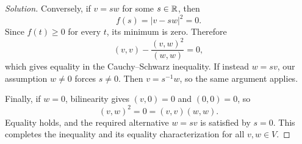 \begin{proof}[Solution]
  Conversely, if \(v=sw\) for some \(s\in\mathbb{R}\), then
  \[
    f(s)=|v-sw|^2=0.
  \]
  Since \(f(t)\ge0\) for every \(t\), its minimum is zero. Therefore
  \[
    (v,v)-\frac{(v,w)^2}{(w,w)}=0,
  \]
  which gives equality in the Cauchy--Schwarz inequality.
  If instead \(w=sv\), our assumption \(w\ne0\) forces
  \(s\ne0\). Then \(v=s^{-1}w\), so the same argument applies.

  Finally, if \(w=0\), bilinearity gives \((v,0)=0\) and
  \((0,0)=0\), so
  \[
    (v,w)^2=0=(v,v)(w,w).
  \]
  Equality holds, and the required alternative \(w=sv\) is satisfied
  by \(s=0\). This completes the inequality and its equality characterization
  for all
  \(v,w\in V\).
\end{proof}
